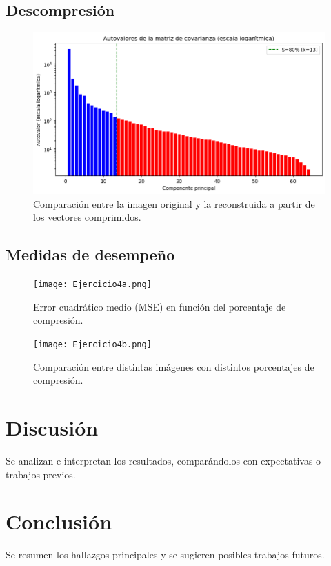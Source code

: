 \documentclass[12pt]{article}
\begin{document}
\subsection{Descompresión}
\begin{figure}[h!]
    \centering
    \includegraphics[width=1\textwidth]{Ejercicio3.png}
    \caption{Comparación entre la imagen original y la reconstruida a partir de los vectores comprimidos.}
\end{figure}

\subsection{Medidas de desempeño}
\begin{figure}[h!]
    \centering
    \texttt{[image: Ejercicio4a.png]}
    \caption{Error cuadrático medio (MSE) en función del porcentaje de compresión.}
\end{figure}

\begin{figure}[h!]
    \centering
    \texttt{[image: Ejercicio4b.png]}
    \caption{Comparación entre distintas imágenes con distintos porcentajes de compresión.}
\end{figure}

\section{Discusión}
Se analizan e interpretan los resultados, comparándolos con expectativas o trabajos previos.

\section{Conclusión}
Se resumen los hallazgos principales y se sugieren posibles trabajos futuros.
\end{document}
